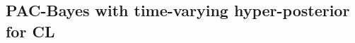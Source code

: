 \documentclass{article} %
\begin{document}









\subsection{PAC-Bayes with time-varying hyper-posterior for CL}



\end{document}
